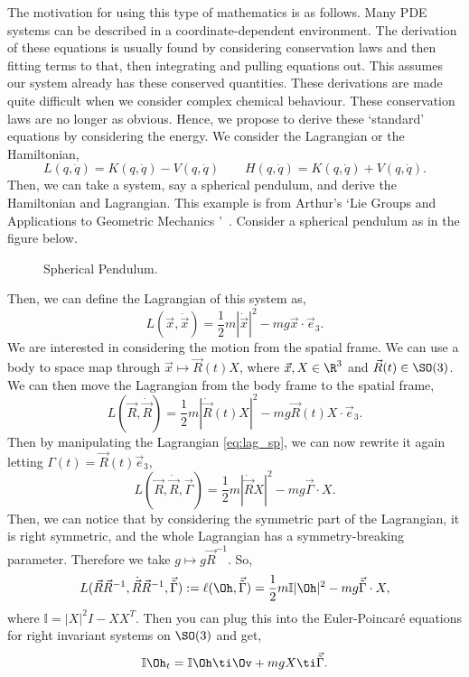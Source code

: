 \noindent
The motivation for using this type of mathematics is as follows. Many PDE systems can be described in a coordinate-dependent environment. The derivation of these equations is usually found by considering conservation laws and then fitting terms to that, then integrating and pulling equations out. This assumes our system already has these conserved quantities. These derivations are made quite difficult when we consider complex chemical behaviour. These conservation laws are no longer as obvious. Hence, we propose to derive these `standard' equations by considering the energy. We consider the Lagrangian or the Hamiltonian,
$$ L(q, \dot q) = K(q, \dot q) - V(q, \dot q) \qquad H(q, \dot q) = K(q, \dot q) + V(q, \dot q). $$
Then, we can take a system, say a spherical pendulum, and derive the Hamiltonian and Lagrangian. This example is from Arthur's `Lie Groups and Applications to Geometric Mechanics '~\cite {arthur}. Consider a spherical pendulum as in the figure below.

\begin{figure}[!ht]
\centering
\resizebox{0.6\textwidth}{!}{}
\caption{Spherical Pendulum.}
\label{fig:diffeos}
\end{figure}

\noindent
Then, we can define the Lagrangian of this system as,
$$ L(\vec x, \dot{\vec x}) = \frac{1}{2}m|\dot {\vec x}|^2 - mg \vec x \cdot \vec e_3. $$
We are interested in considering the motion from the spatial frame. We can use a body to space map through $\vec x \mapsto \vec R(t)X$, where $\vec x, X \in \R^3$ and $\vec R(t) \in \SO(3)$. We can then move the Lagrangian from the body frame to the spatial frame,
\begin{equation}
  L(\vec R, \dot{\vec R}) = \frac{1}{2}m|\dot{\vec R}(t)X|^2 - mg \vec R(t)X \cdot \vec e_3.\label{eq:lag_sp}
\end{equation}
Then by manipulating the Lagrangian \eqref{eq:lag_sp}, we can now rewrite it again letting $\Gamma (t) = \vec R(t)\vec e_3$,
$$ L(\vec R, \dot{\vec R}, \vec\Gamma) = \frac{1}{2}m |\dot{\vec R}X|^2 - mg\vec\Gamma \cdot X. $$
Then, we can notice that by considering the symmetric part of the Lagrangian, it is right symmetric, and the whole Lagrangian has a symmetry-breaking parameter. Therefore we take $g \mapsto g\vec R^{-1}$. So,
$$ L(\vec R\vec R^{-1}, \dot{\vec R}\vec R^{-1}, \vec{\tilde{\Gamma}}) := \ell(\Oh, \vec{\tilde{\Gamma}}) = \frac{1}{2}m \mathbb{I} |\Oh|^2 - mg\vec{\tilde{\Gamma}} \cdot X, $$
where $\mathbb{I} = |X|^2I - XX^T$. Then you can plug this into the Euler-Poincar\'e equations for right invariant systems on $\SO(3)$ and get,
$$ \mathbb{I}\Oh_t = \mathbb{I}\Oh  \ti \Ov + mg X \ti \vec{\tilde{\Gamma}}. $$


